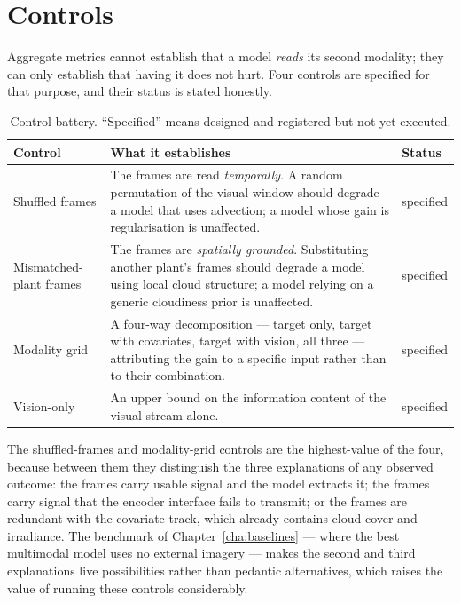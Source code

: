 \section{Controls}
\label{sec:ablation-design}

Aggregate metrics cannot establish that a model \emph{reads} its second modality; they can
only establish that having it does not hurt. Four controls are specified for that purpose,
and their status is stated honestly.

\begin{table}[h!]
\centering
\small
\begin{tabular}{l p{7.0cm} l}
\hline
\textbf{Control} & \textbf{What it establishes} & \textbf{Status} \\
\hline
Shuffled frames & The frames are read \emph{temporally}. A random permutation of the visual
window should degrade a model that uses advection; a model whose gain is regularisation is
unaffected. & specified \\
Mismatched-plant frames & The frames are \emph{spatially grounded}. Substituting another
plant's frames should degrade a model using local cloud structure; a model relying on a
generic cloudiness prior is unaffected. & specified \\
Modality grid & A four-way decomposition --- target only, target with covariates, target
with vision, all three --- attributing the gain to a specific input rather than to their
combination. & specified \\
Vision-only & An upper bound on the information content of the visual stream alone. &
specified \\
\hline
\end{tabular}
\caption{Control battery. ``Specified'' means designed and registered but not yet executed.}
\label{tab:controls}
\end{table}

The shuffled-frames and modality-grid controls are the highest-value of the four, because
between them they distinguish the three explanations of any observed outcome: the frames
carry usable signal and the model extracts it; the frames carry signal that the encoder
interface fails to transmit; or the frames are redundant with the covariate track, which
already contains cloud cover and irradiance. The benchmark of Chapter~\ref{cha:baselines}
--- where the best multimodal model uses no external imagery --- makes the second and third
explanations live possibilities rather than pedantic alternatives, which raises the value of
running these controls considerably.

